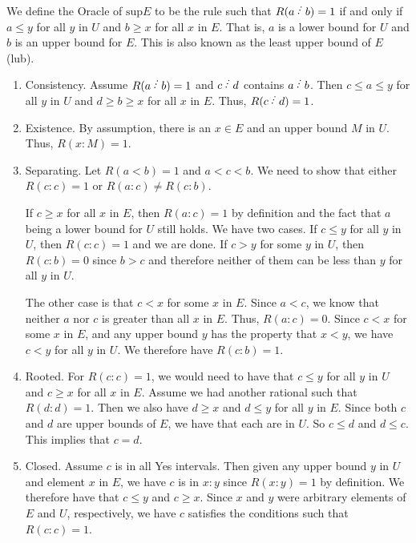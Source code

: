 \documentclass[12pt]{article}
\begin{document}
We define the Oracle of $\mathrm{sup} E$ to be the rule such that $R(a\lte b) = 1$ if and only if $a \leq y$ for all $y$ in $U$ and $b \geq x$ for all $x$ in $E$. That is, $a$ is a lower bound for $U$ and $b$ is an upper bound for $E$. This is also known as the least upper bound of $E$ (lub).

\begin{enumerate}
    \item Consistency. Assume $R(a\lte b)=1$ and $c\lte d$ contains $a\lte b$. Then $c \leq a \leq y$ for all $y$ in $U$ and $d \geq b \geq x$ for all $x$ in $E$. Thus, $R(c\lte d) = 1$.
    \item Existence. By assumption, there is an $x \in E$ and an upper bound $M$ in $U$. Thus, $R(x:M) = 1$. 
    \item Separating. Let $R(a\lt b)=1$ and $a < c< b$. We need to show that either $R(c:c)=1$ or $R(a:c) \neq R(c:b)$. 
    
    If $c \geq x$ for all $x$ in $E$, then $R(a:c)=1$ by definition and the fact that $a$ being a lower bound for $U$ still holds. We have two cases.  If $c \leq y$ for all $y$ in $U$, then $R(c:c)=1$ and we are done. If $c > y$ for some $y$ in $U$, then $R(c:b) = 0$ since $b > c$ and therefore neither of them can be less than $y$ for all $y$ in $U$. 
    
    The other case is that $c < x$ for some $x$ in $E$. Since $a < c$, we know that neither $a$ nor $c$ is greater than all $x$ in $E$. Thus, $R(a:c) = 0$. Since $c < x$ for some $x$ in $E$, and any upper bound $y$ has the property that $x < y$, we have $c < y$ for all $y$ in $U$. We therefore have $R(c:b)=1$.
    
    \item Rooted. For $R(c:c)=1$, we would need to have that $c \leq y$ for all $y$ in $U$ and $c \geq x$ for all $x$ in $E$. Assume we had another rational such that $R(d:d) = 1$. Then we also have $d \geq x$ and $d \leq y$ for all $y$ in $E$. Since both $c$ and $d$ are upper bounds of $E$, we have that each are in $U$. So $c \leq d$ and $d \leq c$. This implies that $c = d$. 
    \item Closed. Assume $c$ is in all Yes intervals. Then given any upper bound $y$ in $U$ and element $x$ in $E$, we have $c$ is in $x:y$ since $R(x:y)=1$ by definition. We therefore have that $c \leq y$ and $c \geq x$. Since $x$ and $y$ were arbitrary elements of $E$ and $U$, respectively, we have $c$ satisfies the conditions such that $R(c:c)=1$.
\end{enumerate}
\end{document}
